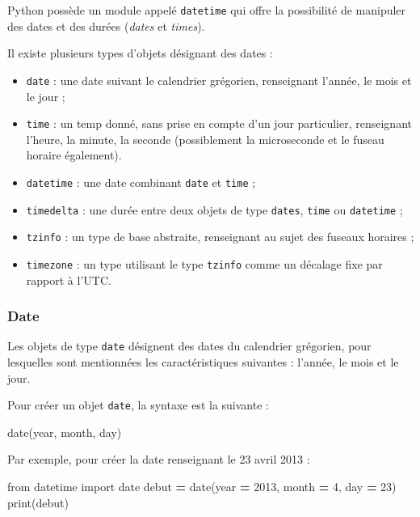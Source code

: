 \documentclass[12pt,]{book}
\newenvironment{Shaded}{\begin{snugshade}}{\end{snugshade}}
\newcommand{\DecValTok}[1]{\textcolor[rgb]{0.00,0.00,0.81}{#1}}
\newcommand{\ImportTok}[1]{#1}
\newcommand{\OperatorTok}[1]{\textcolor[rgb]{0.81,0.36,0.00}{\textbf{#1}}}
\newcommand{\BuiltInTok}[1]{#1}
\newcommand{\NormalTok}[1]{#1}
\providecommand{\tightlist}{%
  \setlength{\itemsep}{0pt}\setlength{\parskip}{0pt}}
\numberwithin{equation}{section}
\numberwithin{countremarque}{section}
\begin{document}
Python possède un module appelé \texttt{datetime} qui offre la
possibilité de manipuler des dates et des durées (\emph{dates} et
\emph{times}).

Il existe plusieurs types d'objets désignant des dates :

\begin{itemize}
\tightlist
\item
  \texttt{date} : une date suivant le calendrier grégorien, renseignant
  l'année, le mois et le jour ;
\item
  \texttt{time} : un temp donné, sans prise en compte d'un jour
  particulier, renseignant l'heure, la minute, la seconde (possiblement
  la microseconde et le fuseau horaire également).
\item
  \texttt{datetime} : une date combinant \texttt{date} et \texttt{time}
  ;
\item
  \texttt{timedelta} : une durée entre deux objets de type
  \texttt{dates}, \texttt{time} ou \texttt{datetime} ;
\item
  \texttt{tzinfo} : un type de base abstraite, renseignant au sujet des
  fuseaux horaires ;
\item
  \texttt{timezone} : un type utilisant le type \texttt{tzinfo} comme un
  décalage fixe par rapport à l'UTC.
\end{itemize}

\subsubsection{Date}\label{type-date}

Les objets de type \texttt{date} désignent des dates du calendrier
grégorien, pour lesquelles sont mentionnées les caractéristiques
suivantes : l'année, le mois et le jour.

Pour créer un objet \texttt{date}, la syntaxe est la suivante :

\begin{Shaded}
\begin{Highlighting}[]
\NormalTok{date(year, month, day)}
\end{Highlighting}
\end{Shaded}

Par exemple, pour créer la date renseignant le 23 avril 2013 :

\begin{Shaded}
\begin{Highlighting}[]
\ImportTok{from}\NormalTok{ datetime }\ImportTok{import}\NormalTok{ date}
\NormalTok{debut }\OperatorTok{=}\NormalTok{ date(year }\OperatorTok{=} \DecValTok{2013}\NormalTok{, month }\OperatorTok{=} \DecValTok{4}\NormalTok{, day }\OperatorTok{=} \DecValTok{23}\NormalTok{)}
\BuiltInTok{print}\NormalTok{(debut)}
\end{Highlighting}
\end{Shaded}
\end{document}
